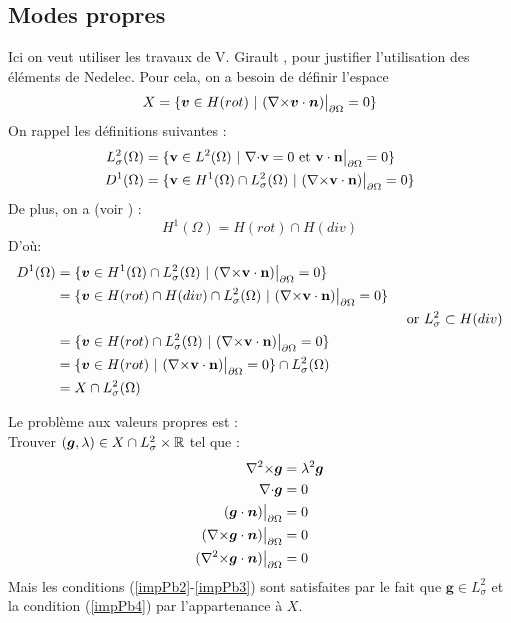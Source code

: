 \subsection{Modes propres}

Ici on veut utiliser les travaux de V. Girault \cite{Girault90-1}, pour justifier l'utilisation des éléments de Nedelec. Pour cela, on a besoin de définir l'espace \[X = \{\bm{v}\in H(rot)\ |\ (\rot\bm{v}\cdot\bm{n})\restr=0 \}\]
On rappel les définitions suivantes :
\begin{align*}
L^2_\sigma(\Omega) &= \{\mathbf{v} \in L^2(\Omega)\ |\ \div \mathbf{v} = 0\text{ et }\mathbf{v}\cdot \mathbf{n}\restr = 0 \}\\
D^1(\Omega) &= \{\mathbf{v} \in H^1(\Omega)\cap L^2_\sigma(\Omega)\ |\ (\rot \mathbf{v}\cdot \mathbf{n})\restr = 0  \}
\end{align*}
De plus, on a (voir \cite{Girault79}) :
\[
H^1(\Omega)=H(rot)\cap H(div)
\]
D'où:
\begin{align*}
D^1(\Omega) &= \{\bm{v}\in H^1(\Omega)\cap L^2_\sigma(\Omega)\ |\ (\rot \mathbf{v}\cdot \mathbf{n})\restr = 0  \}&\\
&=\{\bm{v}\in H(rot)\cap H(div)\cap L^2_\sigma(\Omega)\ |\ (\rot \mathbf{v}\cdot \mathbf{n})\restr = 0  \}&\\
&&\text{ or }L^2_\sigma\subset H(div)\\
&=\{\bm{v}\in H(rot)\cap L^2_\sigma(\Omega)\ |\ (\rot \mathbf{v}\cdot \mathbf{n})\restr = 0  \}&\\
&=\{\bm{v}\in H(rot)\ |\ (\rot \mathbf{v}\cdot \mathbf{n})\restr = 0  \}\cap L^2_\sigma(\Omega)&\\
&=X\cap L^2_\sigma(\Omega)&
\end{align*}


Le problème aux valeurs propres est :\\
Trouver $(\bm{g},\lambda)\in X\cap L^2_\sigma\times{\mathbb{R}}$ tel que :
\begin{align}
{\nabla^2\times}\bm{g}&=\lambda^2\bm{g} \label{impPb1}\\
{\nabla\cdot}\bm{g}&=0 \label{impPb2}\\
(\bm{g}\cdot\bm{n}){\big\rvert_{\partial\Omega}}&=0 \label{impPb3}\\
({\nabla\times}\bm{g}\cdot\bm{n}){\big\rvert_{\partial\Omega}}&=0 \label{impPb4}\\
({\nabla^2\times}\bm{g}\cdot\bm{n}){\big\rvert_{\partial\Omega}}&=0 \label{impPb5}
\end{align}
Mais les conditions (\ref{impPb2}-\ref{impPb3}) sont satisfaites par le fait que $\bm{g}\in L^2_\sigma$ et la condition (\ref{impPb4}) par l'appartenance à $X$.\\

